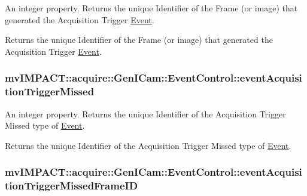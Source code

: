 An integer property. Returns the unique Identifier of the Frame (or image) that generated the Acquisition Trigger \hyperlink{classmv_i_m_p_a_c_t_1_1acquire_1_1_event}{Event}. 

Returns the unique Identifier of the Frame (or image) that generated the Acquisition Trigger \hyperlink{classmv_i_m_p_a_c_t_1_1acquire_1_1_event}{Event}. \hypertarget{classmv_i_m_p_a_c_t_1_1acquire_1_1_gen_i_cam_1_1_event_control_a7cab64b7a83db5cac54a578c023b15f5}{
\subsubsection[{event\+Acquisition\+Trigger\+Missed}]{ mv\+I\+M\+P\+A\+C\+T\+::acquire\+::\+Gen\+I\+Cam\+::\+Event\+Control\+::event\+Acquisition\+Trigger\+Missed}}\label{classmv_i_m_p_a_c_t_1_1acquire_1_1_gen_i_cam_1_1_event_control_a7cab64b7a83db5cac54a578c023b15f5}


An integer property. Returns the unique Identifier of the Acquisition Trigger Missed type of \hyperlink{classmv_i_m_p_a_c_t_1_1acquire_1_1_event}{Event}. 

Returns the unique Identifier of the Acquisition Trigger Missed type of \hyperlink{classmv_i_m_p_a_c_t_1_1acquire_1_1_event}{Event}. \hypertarget{classmv_i_m_p_a_c_t_1_1acquire_1_1_gen_i_cam_1_1_event_control_aa87fa6de6e372f2a7c388fffb91f3dda}{
\subsubsection[{event\+Acquisition\+Trigger\+Missed\+Frame\+I\+D}]{ mv\+I\+M\+P\+A\+C\+T\+::acquire\+::\+Gen\+I\+Cam\+::\+Event\+Control\+::event\+Acquisition\+Trigger\+Missed\+Frame\+I\+D}}\label{classmv_i_m_p_a_c_t_1_1acquire_1_1_gen_i_cam_1_1_event_control_aa87fa6de6e372f2a7c388fffb91f3dda}


